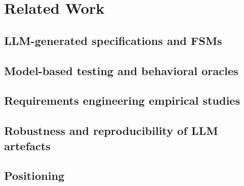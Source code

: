 \section{Related Work}
\label{sec:related-work}


\subsection{LLM-generated specifications and FSMs}
\label{sec:related-work:llm-fsm}

\subsection{Model-based testing and behavioral oracles}
\label{sec:related-work:mbt}

\subsection{Requirements engineering empirical studies}
\label{sec:related-work:re-empirical}

\subsection{Robustness and reproducibility of LLM artefacts}
\label{sec:related-work:robustness-repro}

\subsection{Positioning}
\label{sec:related-work:positioning}

